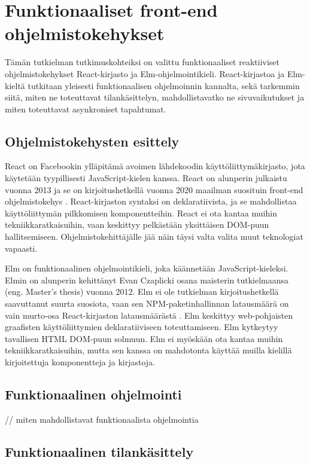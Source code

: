 \chapter{Funktionaaliset front-end ohjelmistokehykset}
Tämän tutkielman tutkimuskohteiksi on valittu funktionaaliset reaktiiviset ohjelmistokehykset React-kirjasto ja
Elm-ohjelmointikieli. React-kirjastoa ja Elm-kieltä tutkitaan yleisesti funktionaalisen ohjelmoinnin kannalta, sekä
tarkemmin siitä, miten ne toteuttavat tilankäsittelyn, mahdollistavatko ne sivuvaikutukset ja miten toteuttavat
asynkroniset tapahtumat.

\section{Ohjelmistokehysten esittely}
React on Facebookin ylläpitämä avoimen lähdekoodin käyttöliittymäkirjasto, jota käytetään tyypillisesti
JavaScript-kielen kanssa. React on alunperin julkaistu vuonna 2013 ja se on kirjoitushetkellä vuonna 2020 maailman
suosituin front-end ohjelmistokehys \cite{npmtrends}. React-kirjaston syntaksi on deklaratiivista, ja se mahdollistaa
käyttöliittymän pilkkomisen komponentteihin. React ei ota kantaa muihin tekniikkaratkaisuihin, vaan keskittyy pelkästään
yksittäisen DOM-puun hallitsemiseen. Ohjelmistokehittäjälle jää näin täysi valta valita muut teknologiat vapaasti.
\cite{reactjs}

Elm on funktionaalinen ohjelmointikieli, joka käännetään JavaScript-kieleksi. Elmin on alunperin kehittänyt Evan
Czaplicki osana maisterin tutkielmaansa (eng. Master's thesis) vuonna 2012. Elm ei ole tutkielman kirjoitushetkellä
saavuttanut suurta suosiota, vaan sen NPM-paketinhallinnan latausmäärä on vain murto-osa React-kirjaston latausmäärästä 
\cite{npmtrends}. Elm keskittyy web-pohjaisten graafisten käyttöliittymien deklaratiiviseen toteuttamiseen. Elm
kytkeytyy tavallisen HTML DOM-puun solmuun. Elm ei myöskään ota kantaa muihin tekniikkaratkaisuihin, mutta sen kanssa on
mahdotonta käyttää muilla kielillä kirjoitettuja komponentteja ja kirjastoja. \cite{elmlang}

\section{Funktionaalinen ohjelmointi}

// miten mahdollistavat funktionaalista ohjelmointia

\section{Funktionaalinen tilankäsittely}

